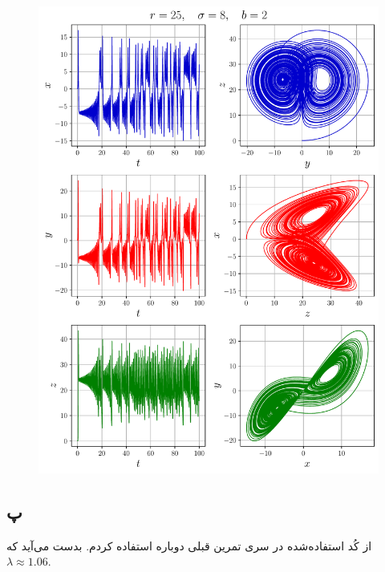 \documentclass[12pt,a4paper]{article}
\begin{document}
	\begin{figure}
		\centering
		\includegraphics{fig/lorenz4}
	\end{figure}
	\restoregeometry
	\subsection{پ}
	از کُد استفاده‌شده در سری تمرین قبلی دوباره استفاده کردم. بدست می‌آید که $\lambda\approx1.06 $.
\end{document}
